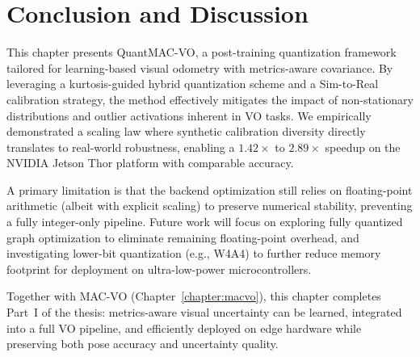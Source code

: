 % 

\section{Conclusion and Discussion}
\label{sec:quantmacvo_conclusion}

This chapter presents QuantMAC-VO, a post-training quantization framework tailored for learning-based visual odometry with metrics-aware covariance. By leveraging a kurtosis-guided hybrid quantization scheme and a Sim-to-Real calibration strategy, the method effectively mitigates the impact of non-stationary distributions and outlier activations inherent in VO tasks. We empirically demonstrated a scaling law where synthetic calibration diversity directly translates to real-world robustness, enabling a $1.42\times$ to $2.89\times$ speedup on the NVIDIA Jetson Thor platform with comparable accuracy.

A primary limitation is that the backend optimization still relies on floating-point arithmetic (albeit with explicit scaling) to preserve numerical stability, preventing a fully integer-only pipeline. Future work will focus on exploring fully quantized graph optimization to eliminate remaining floating-point overhead, and investigating lower-bit quantization (e.g., W4A4) to further reduce memory footprint for deployment on ultra-low-power microcontrollers.

Together with MAC-VO (Chapter~\ref{chapter:macvo}), this chapter completes Part~I of the thesis: metrics-aware visual uncertainty can be learned, integrated into a full VO pipeline, and efficiently deployed on edge hardware while preserving both pose accuracy and uncertainty quality.
